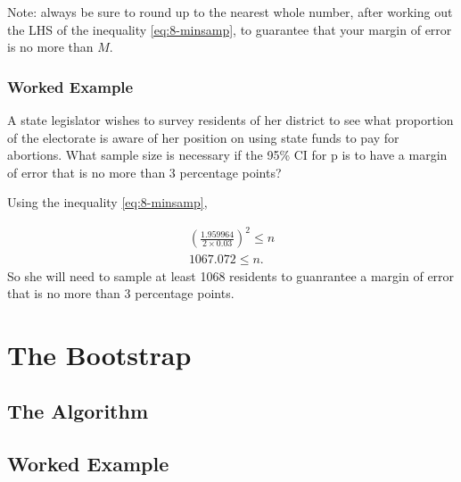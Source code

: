 \documentclass[
]{book}
\begin{document}
Note: always be sure to round up to the nearest whole number, after working out the LHS of the inequality \eqref{eq:8-minsamp}, to guarantee that your margin of error is no more than \(M\).

\subsubsection{Worked Example}\label{worked-example-4}

A state legislator wishes to survey residents of her district to see what proportion of the electorate is aware of her position on using state funds to pay for abortions. What sample size is necessary if the 95\% CI for p is to have a margin of error that is no more than 3 percentage points?

Using the inequality \eqref{eq:8-minsamp},

\[
\begin{split}
\left(\frac{1.959964}{2 \times 0.03}\right)^2 \leq n \\
1067.072 \leq n.
\end{split}
\]
So she will need to sample at least 1068 residents to guanrantee a margin of error that is no more than 3 percentage points.

\section{The Bootstrap}\label{the-bootstrap}

\subsection{The Algorithm}\label{the-algorithm}

\subsection{Worked Example}\label{worked-example-5}

  
\end{document}
